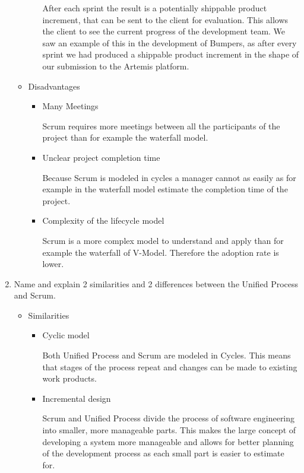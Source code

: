 \documentclass[a4paper, 10pt]{article}
\begin{document}
\begin{enumerate}
\begin{itemize}
\begin{itemize}
            After each sprint the result is a potentially shippable product increment, that can be sent to 
            the client for evaluation.
            This allows the client to see the current progress of the development team.
            We saw an example of this in the development of Bumpers, as after every sprint we had produced a
            shippable product increment in the shape of our submission to the Artemis platform.

    \end{itemize}
        \item Disadvantages
        \begin{itemize}
        \item Many Meetings

        Scrum requires more meetings between all the participants of the project than for example the waterfall model. 

        \item Unclear project completion time

        Because Scrum is modeled in cycles a manager cannot as easily as for example in the waterfall model estimate the 
        completion time of the project.

        \item Complexity of the lifecycle model

        Scrum is a more complex model to understand and apply than for example the waterfall of V-Model. Therefore the 
        adoption rate is lower.
        \end{itemize}
    \end{itemize}
    
    \item Name and explain 2 similarities and 2 differences between the Unified
    Process and Scrum.
    \vspace{0.5cm}

    \begin{itemize}
        \item Similarities
        \begin{itemize}
            \item Cyclic model

            Both Unified Process and Scrum are modeled in Cycles. This means that stages of the process repeat and changes can be 
            made to existing work products.
            \item Incremental design 

            Scrum and Unified Process divide the process of software engineering into smaller, more manageable parts. 
            This makes the large concept of developing a system more manageable and allows for better planning of the development process
            as each small part is easier to estimate for. 
        \end{itemize}


\end{itemize}
\end{enumerate}
\end{document}
